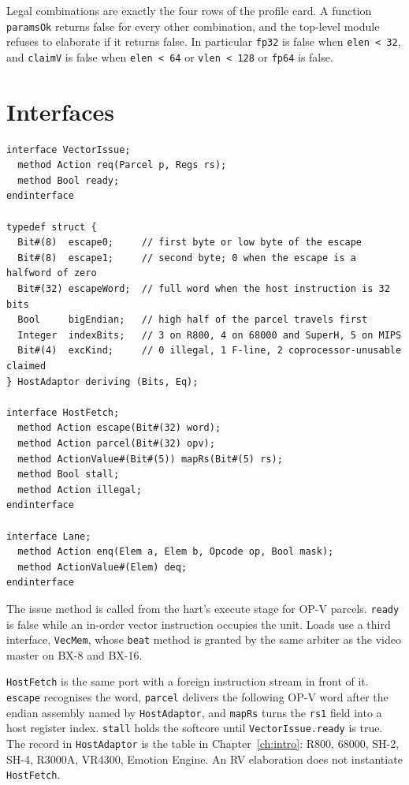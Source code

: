 Legal combinations are exactly the four rows of the profile card. A function \texttt{paramsOk} returns false for every other combination, and the top-level module refuses to elaborate if it returns false. In particular \texttt{fp32} is false when \texttt{elen < 32}, and \texttt{claimV} is false when \texttt{elen < 64} or \texttt{vlen < 128} or \texttt{fp64} is false.

\section{Interfaces}

\begin{lstlisting}
interface VectorIssue;
  method Action req(Parcel p, Regs rs);
  method Bool ready;
endinterface

typedef struct {
  Bit#(8)  escape0;     // first byte or low byte of the escape
  Bit#(8)  escape1;     // second byte; 0 when the escape is a halfword of zero
  Bit#(32) escapeWord;  // full word when the host instruction is 32 bits
  Bool     bigEndian;   // high half of the parcel travels first
  Integer  indexBits;   // 3 on R800, 4 on 68000 and SuperH, 5 on MIPS
  Bit#(4)  excKind;     // 0 illegal, 1 F-line, 2 coprocessor-unusable claimed
} HostAdaptor deriving (Bits, Eq);

interface HostFetch;
  method Action escape(Bit#(32) word);
  method Action parcel(Bit#(32) opv);
  method ActionValue#(Bit#(5)) mapRs(Bit#(5) rs);
  method Bool stall;
  method Action illegal;
endinterface

interface Lane;
  method Action enq(Elem a, Elem b, Opcode op, Bool mask);
  method ActionValue#(Elem) deq;
endinterface
\end{lstlisting}

The issue method is called from the hart's execute stage for OP-V parcels. \texttt{ready} is false while an in-order vector instruction occupies the unit. Loads use a third interface, \texttt{VecMem}, whose \texttt{beat} method is granted by the same arbiter as the video master on BX-8 and BX-16.

\texttt{HostFetch} is the same port with a foreign instruction stream in front of it. \texttt{escape} recognises the word, \texttt{parcel} delivers the following OP-V word after the endian assembly named by \texttt{HostAdaptor}, and \texttt{mapRs} turns the \texttt{rs1} field into a host register index. \texttt{stall} holds the softcore until \texttt{VectorIssue.ready} is true. The record in \texttt{HostAdaptor} is the table in Chapter~\ref{ch:intro}: R800, 68000, SH-2, SH-4, R3000A, VR4300, Emotion Engine. An RV elaboration does not instantiate \texttt{HostFetch}.

